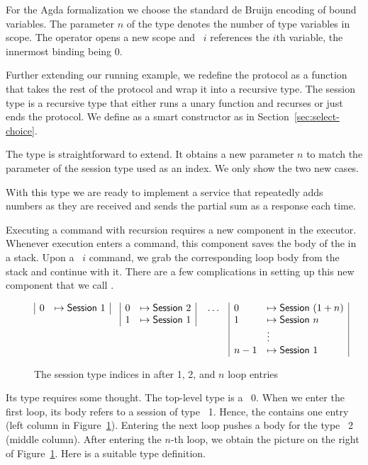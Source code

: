 \documentclass[acmsmall,screen,anonymous,review]{acmart}
\begin{document}
For the Agda formalization we choose the standard de Bruijn encoding
of bound variables. The parameter $n$ of
the {\ASession} type denotes the number of type variables in
scope. The {\Amu} operator opens a new scope and {\Aback~$i$}
references the $i$th variable, the innermost binding being $0$.
\rstSession

Further extending our running example, we redefine the protocol {\Aunaryp} as a function
that takes the rest of the protocol and wrap it into a recursive
type. The session type {\Amanyunaryp} is a recursive type that either
runs a unary function and recurses or just ends the protocol. We
define {\Aamp} as a smart constructor as in Section~\ref{sec:select-choice}.
\rstExampleManyUnaryp

The {\ACommand} type is straightforward to extend. It obtains a new
parameter $n$ to match the parameter of the session type used as an
index. We only show the two new cases.
\rstCommand

With this type we are ready to implement a
service that repeatedly adds numbers as they are received and sends the partial
sum as a response each time.
\rstSumupCommand

Executing a command with recursion requires a new component in the
executor. Whenever execution enters a {\AMU} command, this component
saves the body of the {\AMU} in a stack. Upon a {\ACONTINUE~$i$}
command, we grab the corresponding loop body from the stack and
continue with it. There are a few complications in setting up this new
component that we call {\ACommandStore}.

\begin{figure}[tp]
  \begin{align*}
    &
      \begin{array}[t]{|ll|}
        0 &\mapsto \ASession~1
      \end{array}
    &&
      \begin{array}[t]{|ll|}
        0 &\mapsto \ASession~2 \\
        1 &\mapsto \ASession~1
      \end{array}
          &&
             \dots
    &&
       \begin{array}[t]{|ll|}
         0 & \mapsto \ASession~(1+n) \\
         1 & \mapsto \ASession~n \\
           & \vdots \\
         n-1 & \mapsto \ASession~1
       \end{array}
  \end{align*}
  \caption{The session type indices in {\ACommandStore} after 1, 2, and $n$ loop entries}
  \label{fig:commandstore}
\end{figure}
Its type requires some thought.  The top-level type is a
{\ASession~0}. When we enter the first loop, its body refers to a
session of type {\ASession~1}. Hence, the {\ACommandStore} contains
one entry (left column in Figure~\ref{fig:commandstore}).
Entering the next loop pushes a body for the type {\ASession~2}
(middle column). After entering the $n$-th loop, we obtain the
picture on the right of Figure~\ref{fig:commandstore}. Here is a
suitable type definition.
\rstCommandStore
\end{document}
